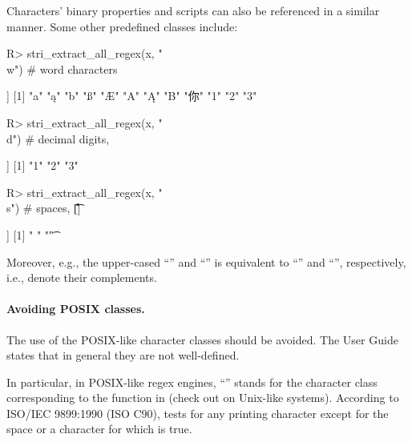 \documentclass[nojss]{jss}
\begin{document}
Characters' binary properties and scripts can also be referenced in a similar manner.
Some other predefined classes include:

\begin{Schunk}
\begin{Sinput}
R> stri_extract_all_regex(x, "\\w")     # word characters
\end{Sinput}
\begin{Soutput}
[[1]]
 [1] "a"  "ą"  "b"  "ß"  "Æ"  "A"  "Ą"  "B"  "你" "1"  "2"  "3"
\end{Soutput}
\begin{Sinput}
R> stri_extract_all_regex(x, "\\d")     # decimal digits, 
\end{Sinput}
\begin{Soutput}
[[1]]
[1] "1" "2" "3"
\end{Soutput}
\begin{Sinput}
R> stri_extract_all_regex(x, "\\s")     # spaces, [\t\n\f\r{}]
\end{Sinput}
\begin{Soutput}
[[1]]
[1] " "  "\t"
\end{Soutput}
\end{Schunk}

Moreover, e.g., the upper-cased ``'' and
``'' is equivalent to
``'' and
``\code{[\^{}\textbackslash{}w]}'', respectively, i.e.,
denote their complements.




\paragraph{Avoiding POSIX classes.}
The use of the POSIX-like character classes should be avoided.
The  User Guide states that in general they are not well-defined.

In particular, in POSIX-like regex engines, ``\code{[:punct:]}''
stands for the character class corresponding to the 
function in  (check out  on Unix-like systems).
According to ISO/IEC 9899:1990 (ISO C90),  tests for
any printing character except for the space or a character for which 
is true.
\end{document}
